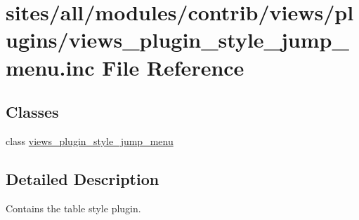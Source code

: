 \hypertarget{views__plugin__style__jump__menu_8inc}{
\section{sites/all/modules/contrib/views/plugins/views\_\-plugin\_\-style\_\-jump\_\-menu.inc File Reference}
\label{views__plugin__style__jump__menu_8inc}
}
\subsection*{Classes}
\begin{CompactItemize}
\item 
class \hyperlink{classviews__plugin__style__jump__menu}{views\_\-plugin\_\-style\_\-jump\_\-menu}
\end{CompactItemize}


\subsection{Detailed Description}
Contains the table style plugin. 